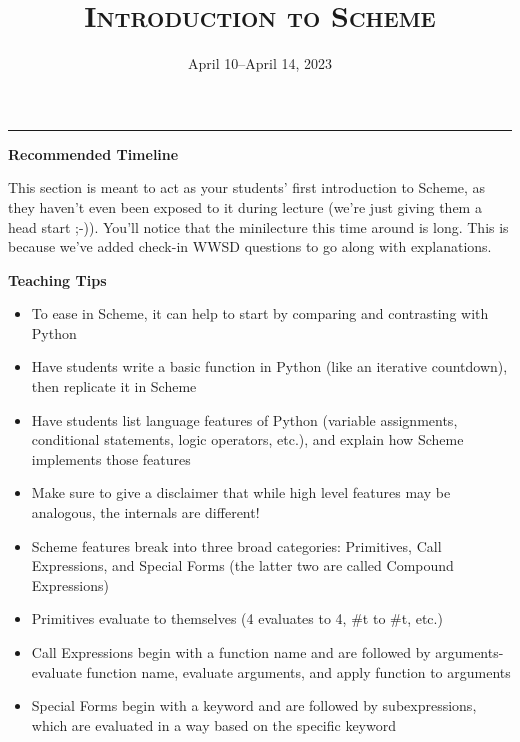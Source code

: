 \documentclass{exam}
\title{\textsc{Introduction to Scheme}}
\date{April 10--April 14, 2023}
\begin{document}
\maketitle
\rule{\textwidth}{0.15em}

\begin{meta}
\begin{blocksection}
    \textbf{Recommended Timeline}
\end{blocksection}
\end{meta}
This section is meant to act as your students' first introduction to Scheme, as they haven't even been exposed to it during lecture (we're just giving them a head start ;-)). You'll notice that the minilecture this time around is long. This is because we've added check-in WWSD questions to go along with explanations.
\begin{meta}
\textbf{Teaching Tips}
\begin{itemize}
    \item To ease in Scheme, it can help to start by comparing and contrasting with Python
    \item Have students write a basic function in Python (like an iterative countdown), then replicate it in Scheme
    \item Have students list language features of Python (variable assignments, conditional statements, logic operators, etc.), and explain how Scheme implements those features
    \item Make sure to give a disclaimer that while high level features may be analogous, the internals are different!
    \item Scheme features break into three broad categories: Primitives, Call Expressions, and Special Forms (the latter two are called Compound Expressions)
    \item Primitives evaluate to themselves (4 evaluates to 4, \#t to \#t, etc.)
    \item Call Expressions begin with a function name and are followed by arguments- evaluate function name, evaluate arguments, and apply function to arguments
    \item Special Forms begin with a keyword and are followed by subexpressions, which are evaluated in a way based on the specific keyword
\end{itemize}
\end{meta}
\end{document}
